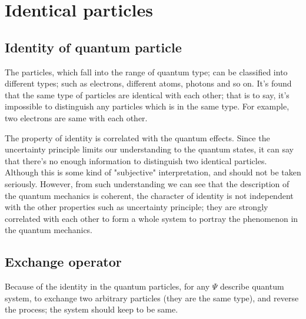%
%
%
%

\chapter{Identical particles}\label{identical_particles}
%
%
%
%
%
%
%
%

\section{Identity of quantum particle}
%
%
The particles, which fall into the range of quantum type; can be
classified into different types; such as electrons, different atoms,
photons and so on. It's found that the same type of particles are
identical with each other; that is to say, it's impossible to
distinguish any particles which is in the same type. For example,
two electrons are same with each other.

The property of identity is correlated with the quantum effects.
Since the uncertainty principle limits our understanding to the
quantum states, it can say that there's no enough information to
distinguish two identical particles. Although this is some kind of
"subjective" interpretation, and should not be taken seriously.
However, from such understanding we can see that the description of
the quantum mechanics is coherent, the character of identity is not
independent with the other properties such as uncertainty principle;
they are strongly correlated with each other to form a whole system
to portray the phenomenon in the quantum mechanics.


\section{Exchange operator}
%
%
%
Because of the identity in the quantum particles, for any $\Psi$
describe quantum system, to exchange two arbitrary particles (they
are the same type), and reverse the process; the system should keep
to be same.

